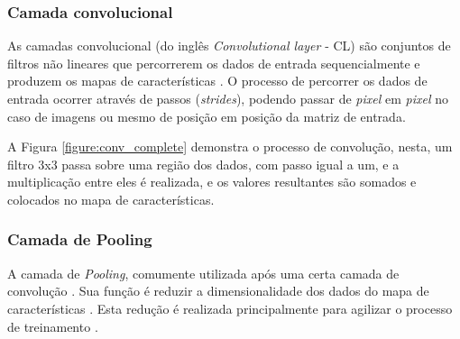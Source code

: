 


\subsubsection{Camada convolucional}

\par As camadas convolucional (do inglês \textit{Convolutional layer} - CL) são conjuntos de filtros não lineares que percorrerem os dados de entrada sequencialmente e produzem os mapas de características \cite{Miyazaki2017}. O processo de percorrer os dados de entrada ocorrer através de passos (\textit{strides}), podendo passar de \textit{pixel} em \textit{pixel} no caso de imagens ou mesmo de posição em posição da matriz de entrada.

\par A Figura \ref{figure:conv_complete} demonstra o processo de convolução, nesta, um filtro 3x3 passa sobre uma região dos dados, com passo igual a um, e a multiplicação entre eles é realizada, e os valores resultantes são somados e colocados no mapa de características.


\subsubsection{Camada de Pooling}

\par A camada de \textit{Pooling}, comumente utilizada após uma certa camada de convolução \cite{Caroline2016}. Sua função é reduzir a dimensionalidade dos dados do mapa de características \cite{Caroline2016}. Esta redução é realizada principalmente para agilizar o processo de treinamento \cite{Caroline2016}.


